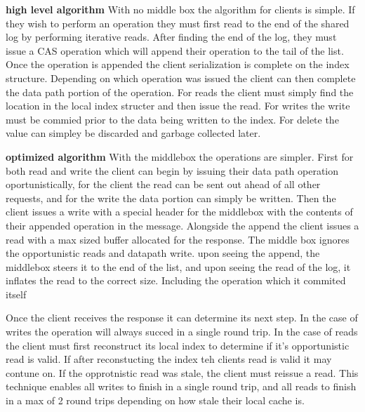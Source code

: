 \textbf{high level algorithm} With no middle box the
algorithm for clients is simple. If they wish to perform an
operation they must first read to the end of the shared log
by performing iterative reads. After finding the end of the
log, they must issue a CAS operation which will append their
operation to the tail of the list. Once the operation is
appended the client serialization is complete on the index
structure. Depending on which operation was issued the
client can then complete the data path portion of the
operation. For reads the client must simply find the
location in the local index structer and then issue the
read. For writes the write must be commied prior to the data
being written to the index. For delete the value can simpley
be discarded and garbage collected later.

\textbf{optimized algorithm} With the middlebox the
operations are simpler. First for both read and write the
client can begin by issuing their data path operation
oportunistically, for the client the read can be sent out
ahead of all other requests, and for the write the data
portion can simply be written. Then the client issues a
write with a special header for the middlebox with the
contents of their appended operation in the message.
Alongside the append the client issues a read with a max
sized buffer allocated for the response. The middle box
ignores the opportunistic reads and datapath write. upon
seeing the append, the middlebox steers it to the end of the
list, and upon seeing the read of the log, it inflates the
read to the correct size. Including the operation which it
commited itself

Once the client receives the response it can determine its
next step. In the case of writes the operation will always
succed in a single round trip. In the case of reads the
client must first reconstruct its local index to determine
if it's opportunistic read is valid. If after reconstucting
the index teh clients read is valid it may contune on. If
the opprotnistic read was stale, the client must reissue a
read. This technique enables all writes to finish in a
single round trip, and all reads to finish in a max of 2
round trips depending on how stale their local cache is.


